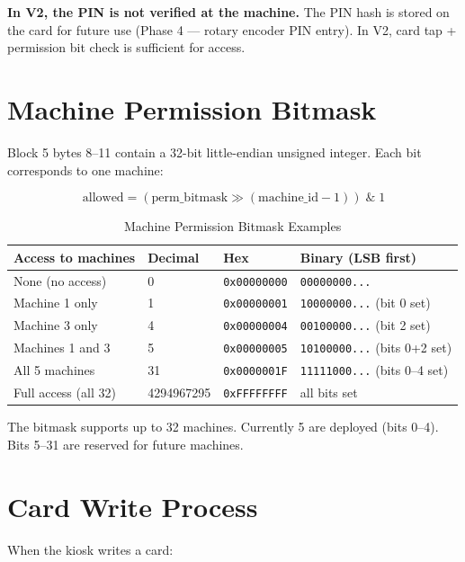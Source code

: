 \begin{warnbox}
\textbf{In V2, the PIN is not verified at the machine.} The PIN hash is stored on the card for future use (Phase 4 --- rotary encoder PIN entry). In V2, card tap + permission bit check is sufficient for access.
\end{warnbox}

\section{Machine Permission Bitmask}

Block 5 bytes 8--11 contain a 32-bit little-endian unsigned integer. Each bit corresponds to one machine:

\begin{equation}
\text{allowed} = (\text{perm\_bitmask} \gg (\text{machine\_id} - 1)) \;\&\; 1
\end{equation}

\begin{table}[H]
\centering
\caption{Machine Permission Bitmask Examples}
\begin{tabular}{L{3cm}C{2cm}C{3cm}L{5.5cm}}
\toprule
\textbf{Access to machines} & \textbf{Decimal} & \textbf{Hex} & \textbf{Binary (LSB first)} \\
\midrule
None (no access) & 0 & \texttt{0x00000000} & \texttt{00000000...} \\
Machine 1 only & 1 & \texttt{0x00000001} & \texttt{10000000...} (bit 0 set) \\
Machine 3 only & 4 & \texttt{0x00000004} & \texttt{00100000...} (bit 2 set) \\
Machines 1 and 3 & 5 & \texttt{0x00000005} & \texttt{10100000...} (bits 0+2 set) \\
All 5 machines & 31 & \texttt{0x0000001F} & \texttt{11111000...} (bits 0--4 set) \\
Full access (all 32) & 4294967295 & \texttt{0xFFFFFFFF} & all bits set \\
\bottomrule
\end{tabular}
\end{table}

The bitmask supports up to 32 machines. Currently 5 are deployed (bits 0--4). Bits 5--31 are reserved for future machines.

\section{Card Write Process}

When the kiosk writes a card:

